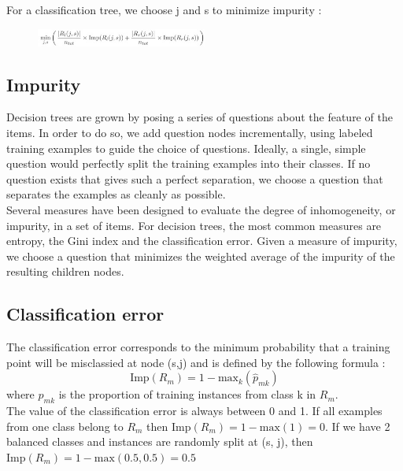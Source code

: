 \documentclass[a4paper,12pt]{article}
\begin{document}
For a classification tree, we choose j and s to minimize impurity : \\
\begin{figure}[h]
  \centering
  \includegraphics[width=0.5\textwidth]{figures/s5.jpg}
  \label{fig:ensemble learning}
\end{figure}

\subsection{Impurity}

Decision trees are grown by posing a series of questions about the feature of the items. In order to do so, we add question nodes incrementally, using labeled training examples to guide the choice of questions. Ideally, a single, simple question would perfectly split the training examples into their classes. If no question exists that gives such a perfect separation, we choose a question that separates the examples as cleanly as possible. \\

Several measures have been designed to evaluate the degree of inhomogeneity, or impurity, in a set of items. For decision trees, the most common measures are entropy, the Gini index and the classification error. Given a measure of impurity, we choose a question that minimizes the weighted average of the impurity of the resulting children nodes.

\subsection{Classification error}

The classification error corresponds to the minimum probability that a training point will be misclassied at node (s,j) and is defined by the following formula :
\[
\textrm{Imp}(R_m)= 1 - \textrm{max}_{  k}(\hat{p}_{mk})
\]
where \( \hat{p}_{mk} \) is the proportion of training instances from class k in \(R_m\). \\

The value of the classification error is always between 0 and 1. If all examples from one class belong to \(R_m\) then \( \textrm{Imp}(R_m)= 1 - \textrm{max}{(1)} = 0 \). If we have 2 balanced classes and instances are randomly split at (s, j), then \( \textrm{Imp}(R_m)= 1 - \textrm{max}{(
0.5, 0.5)} = 0.5 \)
\end{document}
